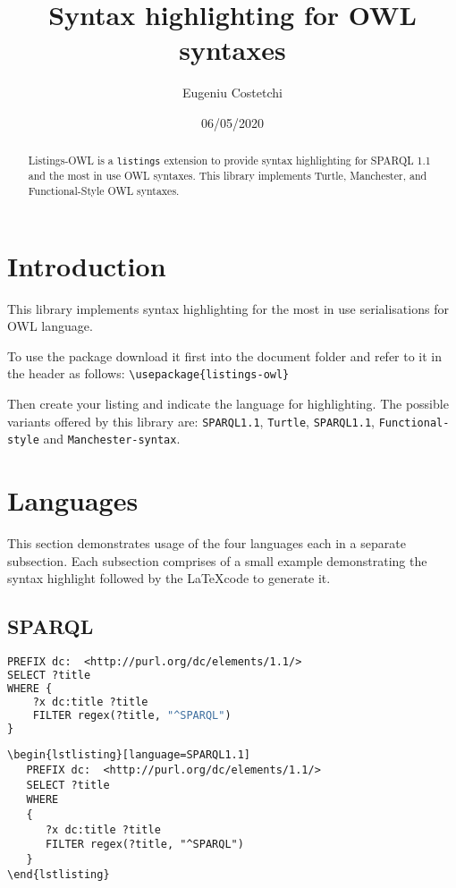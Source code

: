 \documentclass[11pt,a4paper,final,oneside,onecolumn]{article}
\author{Eugeniu Costetchi}
\title{Syntax highlighting for OWL syntaxes}
\date{06/05/2020}
\begin{document}
	\maketitle
	
	\tableofcontents
	
	\begin{abstract}
		Listings-OWL is a \texttt{listings} extension to provide syntax highlighting for SPARQL 1.1 and the most in use OWL syntaxes. This library implements Turtle, Manchester, and Functional-Style OWL syntaxes. 
	\end{abstract}
	
	\section{Introduction}
	This library implements syntax highlighting for the most in use serialisations for OWL language. 
	
	To use the package download it first into the document folder and refer to it in the header as follows: \verb|\usepackage{listings-owl}|	
	
	Then create your listing and indicate the language for highlighting. The possible variants offered by this library are: \texttt{SPARQL1.1}, \texttt{Turtle}, \texttt{SPARQL1.1}, \texttt{Functional-style} and \texttt{Manchester-syntax}.
	
	\section{Languages}

	This section demonstrates usage of the four languages each in a separate subsection. Each subsection comprises of a small example demonstrating the syntax highlight followed by the \LaTeX code to generate it. 
	\subsection{SPARQL}
\begin{lstlisting}[language=SPARQL1.1]
PREFIX dc:  <http://purl.org/dc/elements/1.1/>
SELECT ?title
WHERE { 
	?x dc:title ?title
	FILTER regex(?title, "^SPARQL") 
}	
\end{lstlisting}

\begin{verbatim}
\begin{lstlisting}[language=SPARQL1.1]
   PREFIX dc:  <http://purl.org/dc/elements/1.1/>
   SELECT ?title
   WHERE 
   { 
      ?x dc:title ?title
      FILTER regex(?title, "^SPARQL") 
   }   
\end{lstlisting}
\end{verbatim}
	
\end{document}
